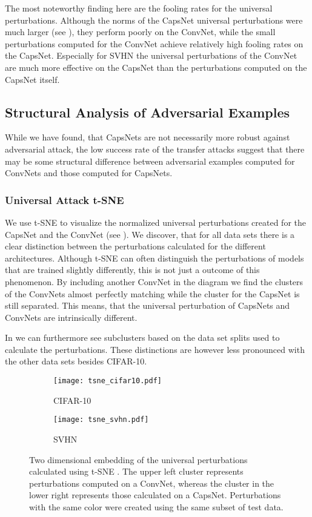 The most noteworthy finding here are the fooling rates for the universal perturbations.
Although the norms of the CapsNet universal perturbations were much larger (see ), they perform poorly on the ConvNet, while the small perturbations computed for the ConvNet achieve relatively high fooling rates on the CapsNet.
Especially for SVHN the universal perturbations of the ConvNet are much more effective on the CapsNet than the perturbations computed on the CapsNet itself.

\subsection{Structural Analysis of Adversarial Examples}

While we have found, that CapsNets are not necessarily more robust against adversarial attack, the low success rate of the transfer attacks suggest that there may be some structural difference between adversarial examples computed for ConvNets and those computed for CapsNets. 

\subsubsection{Universal Attack t-SNE}

We use t-SNE \citep{tsne} to visualize the normalized universal perturbations created for the CapsNet and the ConvNet (see ).
We discover, that for all data sets there is a clear distinction between the perturbations calculated for the different architectures.
Although t-SNE can often distinguish the perturbations of models that are trained slightly differently, this is not just a outcome of this phenomenon.
By including another ConvNet in the diagram we find the clusters of the ConvNets almost perfectly matching while the cluster for the CapsNet is still separated.
This means, that the universal perturbation of CapsNets and ConvNets are intrinsically different.

In  we can furthermore see subclusters based on the data set splits used to calculate the perturbations.
These distinctions are however less pronounced with the other data sets besides CIFAR-10.

\begin{figure}
	\centering
	\begin{subfigure}{.5\textwidth}
	\texttt{[image: tsne\_cifar10.pdf]}
	\caption{CIFAR-10}
	\end{subfigure}%
	\begin{subfigure}{.5\textwidth}
	\texttt{[image: tsne\_svhn.pdf]}
	\caption{SVHN}
	\end{subfigure}
	\caption[t-SNE Plot of Universal Perturbations]{Two dimensional embedding of the universal perturbations calculated using t-SNE \citep{tsne}. The upper left cluster represents perturbations computed on a ConvNet, whereas the cluster in the lower right represents those calculated on a CapsNet. Perturbations with the same color were created using the same subset of test data.}
	\label{fig:tsne}
\end{figure}



